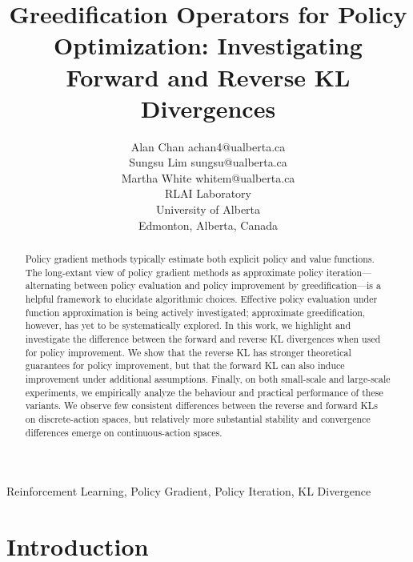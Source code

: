 \documentclass[twoside,11pt]{article}
\begin{document}
\title{Greedification Operators for Policy Optimization: Investigating Forward and Reverse KL Divergences}

\author{\name Alan Chan \email achan4@ualberta.ca \\
        \name Sungsu Lim \email sungsu@ualberta.ca \\
        \name Martha White \email whitem@ualberta.ca \\
       \addr RLAI Laboratory\\
       University of Alberta\\
       Edmonton, Alberta, Canada
       }


\maketitle

\begin{abstract}%
Policy gradient methods typically estimate both explicit policy and value functions. The long-extant view of policy gradient methods as approximate policy iteration---alternating between policy evaluation and policy improvement by greedification---is a helpful framework to elucidate algorithmic choices. Effective policy evaluation under function approximation is being actively investigated; approximate greedification, however, has yet to be systematically explored. 
In this work, we highlight and investigate the difference between the forward and reverse KL divergences when used for policy improvement. We show that the reverse KL has stronger theoretical guarantees for policy improvement, but that the forward KL can also induce improvement under additional assumptions. Finally, on both small-scale and large-scale experiments, we empirically analyze the behaviour and practical performance of these variants. We observe few consistent differences between the reverse and forward KLs on discrete-action spaces, but relatively more substantial stability and convergence differences emerge on continuous-action spaces.
\end{abstract}

\begin{keywords}
  Reinforcement Learning, Policy Gradient, Policy Iteration, KL Divergence
\end{keywords}

\section{Introduction}
\end{document}
